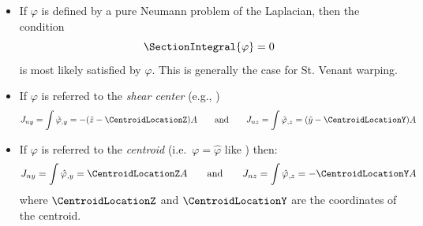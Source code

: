\begin{itemize}
\item If \(\varphi\) is defined by a pure Neumann problem of the Laplacian, then the condition 
\[
\SectionIntegral{\varphi} = 0
\]
is most likely satisfied by \(\varphi\). This is generally the case for St. Venant warping.
\item
  If \(\varphi\) is referred to the \emph{shear
  center} (e.g., \cite{gruttmann1998geometrical}) 
  \begin{equation*}
  J_{ny} = \int \tilde{\varphi}_{,y} = -(\tilde{z} - \CentroidLocationZ) A
  \qquad\text{and}\qquad
  J_{nz} = \int \tilde{\varphi}_{,z} =  (\tilde{y} - \CentroidLocationY) A
  \end{equation*}
\item
  If \(\varphi\) is referred to the \emph{centroid}
  (i.e.~\(\varphi = \hat{\varphi}\) like \cite{gruttmann2000theory}) then:
  \[
  J_{ny} = \int \hat{\varphi}_{,y} =    \CentroidLocationZ A \\
  \qquad\text{and}\qquad
  J_{nz} = \int \hat{\varphi}_{,z} =  - \CentroidLocationY A
  \]
  where \(\CentroidLocationZ\) and \(\CentroidLocationY\) are the coordinates of the centroid.
\end{itemize}

